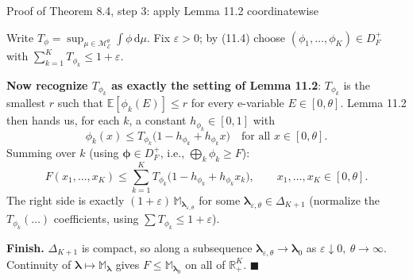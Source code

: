 \documentclass[aspectratio=169,10pt]{beamer}
\newcommand{\EE}{\mathbb{E}}
\newcommand{\RR}{\mathbb{R}}
\newcommand{\1}{\mathbb{1}}
\begin{document}
\begin{frame}[allowframebreaks]{Proof of Theorem 8.4, step 3: apply Lemma 11.2 coordinatewise}

Write $T_\phi = \sup_{\mu\in\mathcal M_{\mathcal E}^\theta}\int \phi\,\mathrm{d}\mu$. Fix $\varepsilon>0$; by (11.4) choose $(\phi_1,\dots,\phi_K)\in D_F^+$ with $\sum_{k=1}^K T_{\phi_k} \le 1+\varepsilon$.

\textbf{Now recognize $T_{\phi_k}$ as exactly the setting of Lemma 11.2}: $T_{\phi_k}$ is the smallest $r$ such that $\EE[\phi_k(E)]\le r$ for every e-variable $E \in [0,\theta]$. Lemma 11.2 then hands us, for each $k$, a constant $h_{\phi_k}\in[0,1]$ with
\[
\phi_k(x) \le T_{\phi_k}\bigl(1-h_{\phi_k}+h_{\phi_k}x\bigr) \quad \text{for all } x\in[0,\theta].
\]
Summing over $k$ (using $\boldsymbol\phi \in D_F^+$, i.e., $\bigoplus_k \phi_k \ge F$):
\[
F(x_1,\dots,x_K) \le \sum_{k=1}^K T_{\phi_k}\bigl(1-h_{\phi_k}+h_{\phi_k}x_k\bigr), \qquad x_1,\dots,x_K\in[0,\theta].
\]
The right side is exactly $(1+\varepsilon)\,\mathbb{M}_{\boldsymbol\lambda_{\varepsilon,\theta}}$ for some $\boldsymbol\lambda_{\varepsilon,\theta}\in\Delta_{K+1}$ (normalize the $T_{\phi_k}(\ldots)$ coefficients, using $\sum T_{\phi_k}\le 1+\varepsilon$).

\textbf{Finish.} $\Delta_{K+1}$ is compact, so along a subsequence $\boldsymbol\lambda_{\varepsilon,\theta}\to\boldsymbol\lambda_0$ as $\varepsilon\downarrow0,\ \theta\to\infty$. Continuity of $\boldsymbol\lambda\mapsto \mathbb M_{\boldsymbol\lambda}$ gives $F \le \mathbb M_{\boldsymbol\lambda_0}$ on all of $\RR_+^K$. $\blacksquare$

\end{frame}
\end{document}
